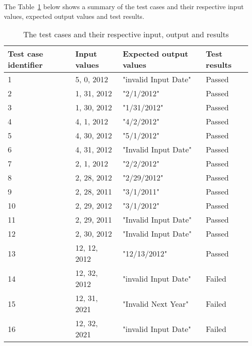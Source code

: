 \noindent The Table~\ref{testinputtable} below shows a summary of the test cases and their respective input values, expected output values and test results. 

\begin{table}[!htb]
	\centering
	\caption{The test cases and their respective input, output and results}
	\label{testinputtable}	
    \begin{tabular}{|l|l|l|l|}
        \hline
        Test case identifier & Input values & Expected output values &  Test results \\ \hline
        1                    & 5, 0, 2012   & "invalid Input Date"   &  Passed       \\ 
        2                    & 1, 31, 2012  & "2/1/2012"             &  Passed       \\ 
        3                    & 1, 30, 2012  & "1/31/2012"            &  Passed       \\ 
        4                    & 4, 1, 2012   & "4/2/2012"             &  Passed       \\ 
        5                    & 4, 30, 2012  & "5/1/2012"             &  Passed       \\ 
        6                    & 4, 31, 2012  & "Invalid Input Date"   &  Passed       \\ 
        7                    & 2, 1, 2012   & "2/2/2012"             &  Passed       \\ 
        8                    & 2, 28, 2012  & "2/29/2012"            &  Passed       \\ 
        9                    & 2, 28, 2011  & "3/1/2011"             &  Passed       \\ 
        10                   & 2, 29, 2012  & "3/1/2012"             &  Passed       \\ 
        11                   & 2, 29, 2011  & "Invalid Input Date"   &  Passed       \\ 
        12                   & 2, 30, 2012  & "Invalid Input Date"   &  Passed       \\ 
        13                   & 12, 12, 2012 & "12/13/2012"           &  Passed       \\ 
        14                   & 12, 32, 2012 & "invalid Input Date"   &  Failed       \\ 
        15                   & 12, 31, 2021 & "Invalid Next Year"    &  Failed       \\ 
        16                   & 12, 32, 2021 & "invalid Input Date"   &  Failed       \\ 

\end{tabular}
\end{table}
